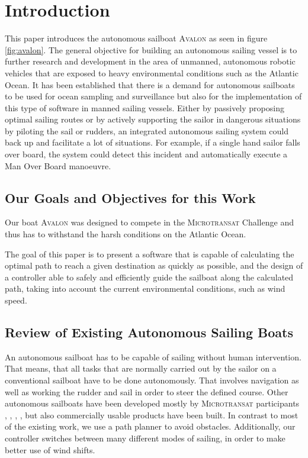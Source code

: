 \section{Introduction}
This paper introduces the autonomous sailboat \textsc{Avalon} as seen in figure
\ref{fig:avalon}. The general objective for building an autonomous sailing
vessel is to further research and development in the area of unmanned,
autonomous robotic vehicles that are exposed to heavy environmental conditions
such as the Atlantic Ocean. It has been established that there is a demand for
autonomous sailboats to be used for ocean sampling and surveillance
\cite{cruz:ase} but also for the implementation of this type of software in
manned sailing vessels. Either by passively proposing optimal sailing routes or
by actively supporting the sailor in dangerous situations by piloting the sail
or rudders, an integrated autonomous sailing system could back up and
facilitate a lot of situations. For example, if a single hand sailor falls over
board, the system could detect this incident and automatically execute a Man
Over Board manoeuvre.

\subsection{Our Goals and Objectives for this Work}
Our boat \textsc{Avalon} was designed to compete in the \textsc{Microtransat}
Challenge and thus has to withstand the harsh conditions on the Atlantic Ocean.

The goal of this paper is to present a software that is
capable of calculating the optimal path to reach a given destination as quickly
as possible, and the design of a controller able to safely and efficiently
guide the sailboat along the calculated path, taking into account the current
environmental conditions, such as wind speed.


\subsection{Review of Existing Autonomous Sailing Boats}
An autonomous sailboat has to be capable of sailing without human intervention.
That means, that all tasks that are normally carried out by the sailor on a
conventional sailboat have to be done autonomously. That involves navigation
as well as working the rudder and sail in order to steer the defined course.
Other autonomous sailboats have been developed mostly by \textsc{Microtransat}
participants \cite{briere2008iar}, \cite{stelzer2008}, \cite{alves:fas},
\cite{sauze2008dcs}, but also commercially usable products \cite{harborwing}
have been built. In contrast to most of the existing work, we use a path
planner to avoid obstacles. Additionally, our controller switches between many
different modes of sailing, in order to make better use of wind shifts.

